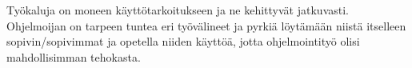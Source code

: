 \documentclass[finnish]{tktltiki2}
\theoremstyle{definition}
\theoremstyle{remark}
\begin{document}
Työkaluja on moneen käyttötarkoitukseen ja ne kehittyvät jatkuvasti. Ohjelmoijan on tarpeen tuntea eri työvälineet ja pyrkiä löytämään niistä itselleen sopivin/sopivimmat ja opetella niiden käyttöä, jotta ohjelmointityö olisi mahdollisimman tehokasta.

\newpage


\end{document}
